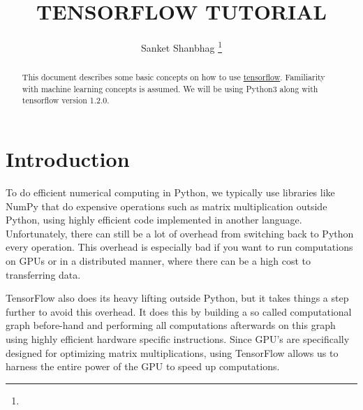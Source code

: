 \documentclass[Proceedings]{ascelike}
\begin{document}
%
\title{TENSORFLOW TUTORIAL}
%
\author{
Sanket Shanbhag
%
\thanks{}
%
%
%
%
%
%
}
%
\maketitle
%
\begin{abstract}
This document describes some basic concepts on how to use \href{https://www.tensorflow.org/install/}{tensorflow}.
Familiarity with machine learning concepts is assumed. We will be using Python3 along with tensorflow version 1.2.0.
\end{abstract}
%
%

%
\section{Introduction}
To do efficient numerical computing in Python, we typically use libraries like NumPy that do expensive operations such as matrix multiplication outside Python, using highly efficient code implemented in another language. Unfortunately, there can still be a lot of overhead from switching back to Python every operation. This overhead is especially bad if you want to run computations on GPUs or in a distributed manner, where there can be a high cost to transferring data.

TensorFlow also does its heavy lifting outside Python, but it takes things a step further to avoid this overhead. It does this by building a so called computational graph before-hand and performing all computations afterwards on this graph using highly efficient hardware specific instructions. Since GPU's are specifically designed for optimizing matrix multiplications, using TensorFlow allows us to harness the entire power of the GPU to speed up computations. 
\end{document}

